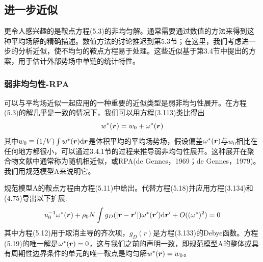 \subsection{进一步近似}
更令人感兴趣的是鞍点方程(5.3)的非均匀解。通常需要通过数值的方法来得到这种平均场解的精确描述。数值方法的讨论推迟到第5.3节；在这里，我们考虑进一步的分析近似，使不均匀的鞍点方程易于处理。这些近似基于第3.4节中提出的方案，用于估计外部势场中单链的统计特性。
\subsubsection{弱非均匀性-RPA}
可以与平均场近似一起应用的一种重要的近似类型是弱非均匀性展开。在方程(5.3)的解几乎是一致的情况下，我们可以用方程(3.113)类比得出
\begin{equation}
w^*(\bm{r})=w_0+\omega^*(\bm{r})
\end{equation}
其中$w_0\equiv(1/V)\int w^*(\bm{r})\mathrm{d}\bm{r}$是体积平均的平均场势场，假设偏差$\omega^*(\bm{r})$与$w_0$相比在任何地方都很小，可以通过3.4.1节的过程来推导弱非均匀性展开。这种展开在聚合物文献中通常称为随机相近似，或RPA(de Gennes，1969；de Gennes，1979)。我们用规范模型A来说明它。

规范模型A的鞍点方程由方程(5.11)中给出。代替方程(5.18)并应用方程(3.134)和(4.75)导出以下扩展:
\begin{equation}
u_0^{-1}\omega^*(\bm{r})+\rho_0N\int g_D(\left|\bm{r}-\bm{r}'\right|)\omega^*(\bm{r}')\mathrm{d}\bm{r}'+O((\omega^*)^2)=0
\end{equation}
其中方程(5.12)用于取消主导的齐次项，$g_D(r)$是方程(3.133)的Debye函数。方程(5.19)的唯一解是$\omega^*(\bm{r})=0$，这与我们之前的声明一致，即规范模型A的整体或具有周期性边界条件的单元的唯一鞍点是均匀解$w^*(\bm{r})=w_0$。

